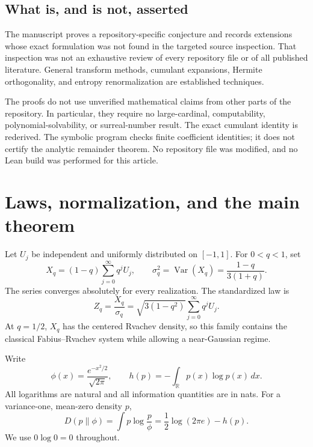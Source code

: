 \documentclass[11pt,a4paper]{article}
\numberwithin{equation}{section}
\theoremstyle{definition}
\theoremstyle{remark}
\newcommand{\R}{\mathbb R}
\newcommand{\Var}{\operatorname{Var}}
\newcommand{\dd}{\,dx}
\begin{document}
\subsection{What is, and is not, asserted}

The manuscript proves a repository-specific conjecture and records extensions
whose exact formulation was not found in the targeted source inspection.
That inspection was not an exhaustive review of every repository file or of all
published literature. General transform methods, cumulant expansions, Hermite
orthogonality, and entropy renormalization are established techniques.

The proofs do not use unverified mathematical claims from other parts of the
repository. In particular, they require no large-cardinal, computability,
polynomial-solvability, or surreal-number result. The exact cumulant identity is
rederived. The symbolic program checks finite coefficient identities; it does
not certify the analytic remainder theorem. No repository file was modified,
and no Lean build was performed for this article.

\section{Laws, normalization, and the main theorem}
\label{sec:main}

Let $U_j$ be independent and uniformly distributed on $[-1,1]$. For $0<q<1$,
set
\begin{equation}
 X_q=(1-q)\sum_{j=0}^{\infty}q^jU_j,
 \qquad
 \sigma_q^2=\Var(X_q)=\frac{1-q}{3(1+q)}.
 \label{eq:law}
\end{equation}
The series converges absolutely for every realization. The standardized law is
\begin{equation}
 Z_q=\frac{X_q}{\sigma_q}
 =\sqrt{3(1-q^2)}\sum_{j=0}^{\infty}q^jU_j.
 \label{eq:standardized}
\end{equation}
At $q=1/2$, $X_q$ has the centered Rvachev density, so this family contains the
classical Fabius--Rvachev system while allowing a near-Gaussian regime.

Write
\begin{equation}
 \phi(x)=\frac{e^{-x^2/2}}{\sqrt{2\pi}},
 \qquad
 h(p)=-\int_{\R}p(x)\log p(x)\dd.
\end{equation}
All logarithms are natural and all information quantities are in nats. For a
variance-one, mean-zero density $p$,
\begin{equation}
 D(p\|\phi)=\int p\log\frac p\phi
 =\frac12\log(2\pi e)-h(p).
 \label{eq:entropy-deficit}
\end{equation}
We use $0\log0=0$ throughout.
\end{document}
